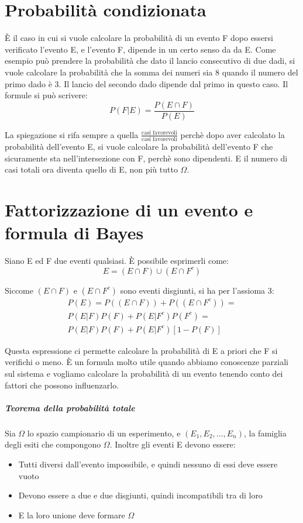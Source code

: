 \documentclass[12pt]{article}
\begin{document}
\newpage

\section{Probabilità condizionata}

È il caso in cui si vuole calcolare la probabilità di un evento F dopo essersi verificato l'evento E, e l'evento F, 
dipende in un certo senso da da E.
Come esempio può prendere la probabilità che dato il lancio consecutivo di due dadi, si vuole calcolare
la probabilità che la somma dei numeri sia 8 quando il numero del primo dado è 3. 
Il lancio del secondo dado dipende dal primo in questo caso. 
Il formule si può scrivere: 
\[
P(F|E) = \frac{P(E \cap F)}{P(E)}     
\]

La spiegazione si rifa sempre a quella \(\frac{\text{casi favorevoli}}{\text{casi favorevoli}}\)
perchè dopo aver calcolato la probabilità dell'evento E, si vuole calcolare la probabilità
dell'evento F che sicuramente sta nell'intersezione con F, perchè sono dipendenti. E il numero di casi totali
ora diventa quello di E, non più tutto \(\Omega\). 

\section{Fattorizzazione di un evento e formula di Bayes}

Siano E ed F due eventi qualsiasi. È possibile esprimerli come: 
\[
E = (E \cap F) \cup (E \cap F^c)    
\]

Siccome \((E \cap F)\) e \((E \cap F^c)\) sono eventi disgiunti, si ha per l'assioma 3:
\begin{align*}
    P(E) = P((E \cap F)) + P((E \cap F^c)) =  \\
P(E|F)P(F) + P(E|F^c)P(F^c) = \\ 
P(E|F)P(F) + P(E|F^c)[1-P(F)]    
\end{align*}

Questa espressione ci permette calcolare la probabilità di E a priori che 
F si verifichi o meno. È un formula molto utile quando abbiamo conoscenze
parziali sul sistema e vogliamo calcolare la probabilità di un evento tenendo 
conto dei fattori che possono influenzarlo.


\newpage
\subparagraph*{Teorema della probabilità totale} 

Sia \(\Omega\) lo spazio campionario di un esperimento, e \((E_1,E_2,\dots, E_n)\), 
la famiglia degli esiti che compongono \(\Omega\). Inoltre gli eventi E devono essere:
\begin{itemize}
    \item Tutti diversi dall'evento impossibile, e quindi nessuno di essi deve essere vuoto
    \item Devono essere a due e due disgiunti, quindi incompatibili tra di loro
    \item E la loro unione deve formare \(\Omega\)
\end{itemize} 
\end{document}
